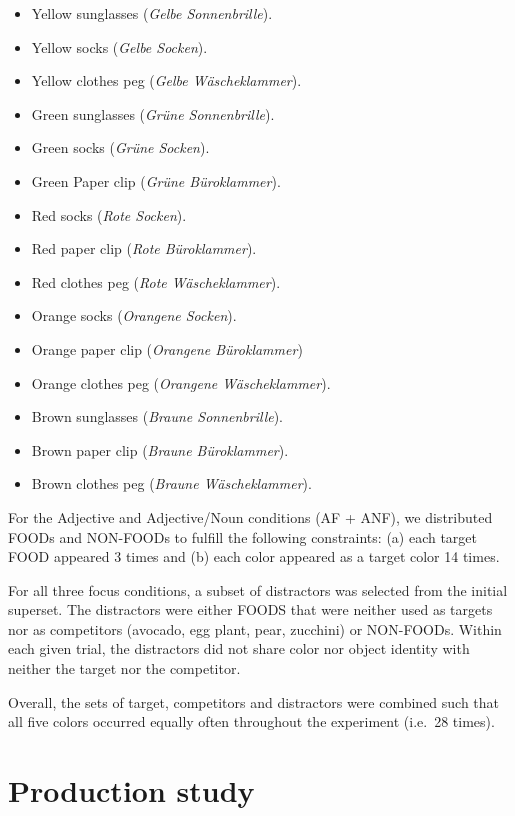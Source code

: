 \documentclass[
  12pt,
]{article}
\providecommand{\tightlist}{%
  \setlength{\itemsep}{0pt}\setlength{\parskip}{0pt}}
\begin{document}
\begin{itemize}
\tightlist
\item
  Yellow sunglasses (\emph{Gelbe Sonnenbrille}).
\item
  Yellow socks (\emph{Gelbe Socken}).
\item
  Yellow clothes peg (\emph{Gelbe Wäscheklammer}).
\item
  Green sunglasses (\emph{Grüne Sonnenbrille}).
\item
  Green socks (\emph{Grüne Socken}).
\item
  Green Paper clip (\emph{Grüne Büroklammer}).
\item
  Red socks (\emph{Rote Socken}).
\item
  Red paper clip (\emph{Rote Büroklammer}).
\item
  Red clothes peg (\emph{Rote Wäscheklammer}).
\item
  Orange socks (\emph{Orangene Socken}).
\item
  Orange paper clip (\emph{Orangene Büroklammer})
\item
  Orange clothes peg (\emph{Orangene Wäscheklammer}).
\item
  Brown sunglasses (\emph{Braune Sonnenbrille}).
\item
  Brown paper clip (\emph{Braune Büroklammer}).
\item
  Brown clothes peg (\emph{Braune Wäscheklammer}).
\end{itemize}

For the Adjective and Adjective/Noun conditions (AF + ANF), we distributed FOODs and NON-FOODs to fulfill the following constraints: (a) each target FOOD appeared 3 times and (b) each color appeared as a target color 14 times.

For all three focus conditions, a subset of distractors was selected from the initial superset.
The distractors were either FOODS that were neither used as targets nor as competitors (avocado, egg plant, pear, zucchini) or NON-FOODs.
Within each given trial, the distractors did not share color nor object identity with neither the target nor the competitor.

Overall, the sets of target, competitors and distractors were combined such that all five colors occurred equally often throughout the experiment (i.e.~28 times).

\hypertarget{production-study}{%
\section{Production study}\label{production-study}}
\end{document}
